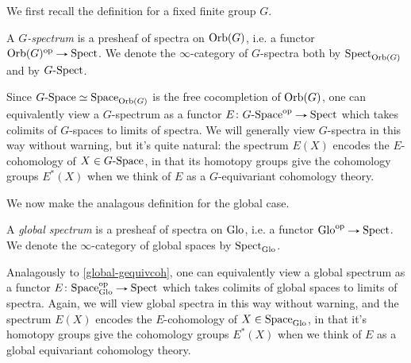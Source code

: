 We first recall the definition for a fixed finite group $G$.

\begin{definition}
  \label{global-gpectrum}
  A \emph{$G$-spectrum} is a presheaf of spectra on $\mathrm{Orb}(G)$, i.e. a
  functor $\Orb(G)^\op \to \Spect$. We denote the $\infty$-category of
  $G$-spectra both by $\mathrm{Spect}_{\mathrm{Orb}(G)}$ and by $G\text{-}\mathrm{Spect}$.
\end{definition}

\begin{remark}
  \label{global-gequivcoh}
  Since $G\text{-}\mathrm{Space} \simeq \mathrm{Space}_{\mathrm{Orb}(G)}$ is the free cocompletion
  of $\mathrm{Orb}(G)$, one can equivalently view a $G$-spectrum as a functor
  $E \c G\dash\Space^\op \to \Spect$ which takes colimits of
  $G$-spaces to limits of spectra. We will generally view $G$-spectra
  in this way without warning, but it's quite natural: the spectrum
  $E(X)$ encodes the $E$-cohomology of $X \in G\text{-}\mathrm{Space}$, in that
  its homotopy groups give the cohomology groups $E^*(X)$ when we
  think of $E$ as a $G$-equivariant cohomology theory.
\end{remark}

We now make the analagous definition for the global case.

\begin{definition}
  \label{global-spectrum}
  A \emph{global spectrum} is a presheaf of spectra on $\mathrm{Glo}$, i.e. a
  functor $\Glo^\op \to \Spect$. We denote the $\infty$-category of
  global spaces by $\mathrm{Spect}_{\mathrm{Glo}}$.
\end{definition}

\begin{remark}
  \label{global-globalcoh}
  Analagously to \cref{global-gequivcoh}, one can equivalently view a
  global spectrum as a functor $E \c \Space_\Glo^\op \to \Spect$ which
  takes colimits of global spaces to limits of spectra. Again, we will
  view global spectra in this way without warning, and the spectrum
  $E(X)$ encodes the $E$-cohomology of $X \in \mathrm{Space}_{\mathrm{Glo}}$, in that
  it's homotopy groups give the cohomology groups $E^*(X)$ when we
  think of $E$ as a global equivariant cohomology theory.
\end{remark}

